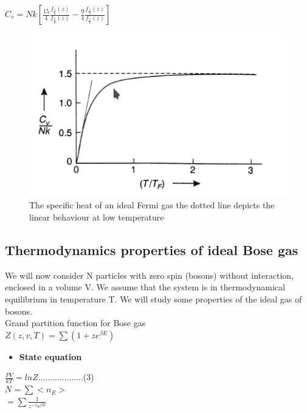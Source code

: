 \documentclass{article}
\newcommand*{\1}{\hspace{1pt}}
\begin{document}
$C_v=Nk[\frac{15}{4}\frac{f_\frac{5}{2}(z)}{f_\frac{3}{2}(z)}-\frac{9}{4}\frac{f_\frac{5}{2}(z)}{f_\frac{3}{2}(z)}]$\\
\begin{figure}[htb!]
    \centering
    \includegraphics[scale=0.5]{lamia3}
    \caption{The specific heat of an ideal Fermi gas the dotted line depicts the linear behaviour at low temperature }
    \label{fig:my_label}
\end{figure}


\subsection{Thermodynamics properties of ideal Bose gas }

We will now consider N particles with zero spin (bosons) without interaction, enclosed in a volume V. We assume that the system is in thermodynamical equilibrium in temperature T. We will study some properties of the ideal gas of bosons.\\

Grand partition function for Bose gas\\

$Z(z,v,T)=\sum(1+ze^{\beta E})$\\

\begin{itemize}
    \item \textbf{State equation}
\end{itemize}

$\frac{PV}{kT}=lnZ$...................(3)\\

$N=\sum<n_E>$\\

$ = \sum\frac{1}{z^{-1}e^{\beta E}}$\\
\end{document}
